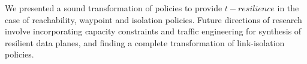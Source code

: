 We presented a sound transformation of policies to provide $t-resilience$ in
the case of reachability, waypoint and isolation policies. Future directions of 
research involve incorporating capacity constraints and traffic engineering
for synthesis of resilient data planes, and finding a complete transformation of
link-isolation policies. 